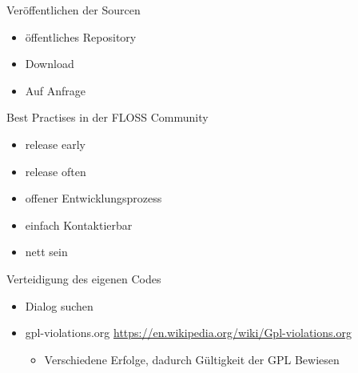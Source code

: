\begin{frame}{Veröffentlichen der Sourcen}
	\begin{itemize}
		\item öffentliches Repository
		\item Download
		\item Auf Anfrage
	\end{itemize}
\end{frame}

\begin{frame}{Best Practises in der FLOSS Community}
	\begin{itemize}
		\item release early
		\item release often
		\item offener Entwicklungsprozess
		\item einfach Kontaktierbar
		\item nett sein
	\end{itemize}
\end{frame}

\begin{frame}{Verteidigung des eigenen Codes}
	\begin{itemize}
		\item Dialog suchen
		\item gpl-violations.org \url{https://en.wikipedia.org/wiki/Gpl-violations.org}
		\begin{itemize}
			\item Verschiedene Erfolge, dadurch Gültigkeit der GPL Bewiesen
		\end{itemize}
	\end{itemize}
\end{frame}
